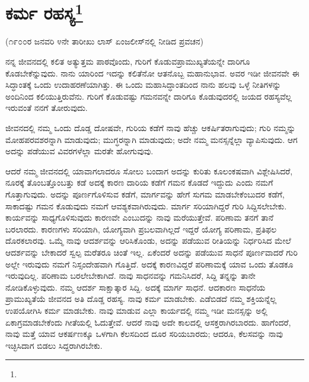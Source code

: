 
\chapter[ಕರ್ಮ ರಹಸ್ಯ]{ಕರ್ಮ ರಹಸ್ಯ\protect\footnote{}}

\begin{center}
(೧೯೦೦ರ ಜನವರಿ ೪ನೇ ತಾರೀಖು ಲಾಸ್ ಏಂಜಲೀಸ್‌ನಲ್ಲಿ ನೀಡಿದ ಪ್ರವಚನ)
\end{center}

ನನ್ನ ಜೀವನದಲ್ಲಿ ಕಲಿತ ಅತ್ಯುತ್ತಮ ಪಾಠವೊಂದು, ಗುರಿಗೆ ಕೊಡುವ\break ಪ್ರಾಮುಖ್ಯತೆಯನ್ನೇ ದಾರಿಗೂ ಕೊಡಬೇಕೆನ್ನುವುದು. ನಾನು ಯಾರಿಂದ ಇದನ್ನು ಕಲಿತೆನೋ ಆತನೊಬ್ಬ ಮಹಾನುಭಾವ. ಅವರ ಇಡೀ ಜೀವನವೇ ಈ ಸಿದ್ಧಾಂತಕ್ಕೆ ಒಂದು ಉದಾಹರಣೆಯಾಗಿತ್ತು. ಈ ಒಂದು ಮಹಾಸಿದ್ಧಾಂತದಿಂದ ನಾನು ಹಲವು ಒಳ್ಳೆ ನೀತಿಗಳನ್ನು ಅಂದಿನಿಂದ ಕಲಿಯುತ್ತಿರುವೆನು. ಗುರಿಗೆ ಕೊಡುವಷ್ಟು ಗಮನವನ್ನೇ ದಾರಿಗೂ ಕೊಡುವುದರಲ್ಲಿ ಜಯದ ರಹಸ್ಯವೆಲ್ಲ ಇರುವಂತೆ ನನಗೆ ತೋರುವುದು.

ಜೀವನದಲ್ಲಿ ನಮ್ಮ ಒಂದು ದೊಡ್ಡ ದೋಷವೇ, ಗುರಿಯ ಕಡೆಗೆ ನಾವು ಹೆಚ್ಚು ಆಕರ್ಷಿತರಾಗುವುದು; ಗುರಿ ನಮ್ಮನ್ನು ಮೋಹಪರವಶರನ್ನಾಗಿ ಮಾಡುವುದು; ಮುಗ್ಧರನ್ನಾಗಿ ಮಾಡುವುದು; ಅದೇ ನಮ್ಮ ಮನಸ್ಸನ್ನೆಲ್ಲಾ ವ್ಯಾಪಿಸುವುದು. ಆಗ ಅದನ್ನು ಪಡೆಯುವ ವಿವರಗಳೆಲ್ಲಾ ಮರತೇ ಹೋಗುವುವು.

ಆದರೆ ನಮ್ಮ ಜೀವನದಲ್ಲಿ ಯಾವಾಗಲಾದರೂ ಸೋಲು ಬಂದಾಗ ಅದನ್ನು ಕುರಿತು ಕೂಲಂಕಷವಾಗಿ ವಿಶ್ಲೇಷಿಸಿದರೆ, ನೂರಕ್ಕೆ ತೊಂಬತ್ತೊಂಬತ್ತು ಕಡೆ ಅದಕ್ಕೆ ಕಾರಣ ದಾರಿಯ ಕಡೆಗೆ ಗಮನ ಕೊಡದೆ ಇದ್ದುದು ಎಂದು ನಮಗೆ ಗೊತ್ತಾಗುವುದು. ಅದನ್ನು ಪೂರ್ಣಗೊಳಿಸುವ ಕಡೆಗೆ, ಮಾರ್ಗವನ್ನು ಹೇಗೆ ಸುಗಮ ಮಾಡಬೇಕೆಂಬುದರ ಕಡೆಗೆ, ಸಾಕಾದಷ್ಟು ಗಮನ ಕೊಡುವುದು ನಮಗೆ ಆವಶ್ಯಕವಾಗಿರುವುದು. ಮಾರ್ಗ ಸರಿಯಾಗಿದ್ದರೆ ಗುರಿ ಸಿದ್ದಿಸಲೇಬೇಕು. ಕಾರ್ಯವನ್ನು ಸಾಧ್ಯಗೊಳಿಸುವುದು ಕಾರಣವೇ ಎಂಬುದನ್ನು ನಾವು ಮರೆಯುತ್ತೇವೆ. ಪರಿಣಾಮ ತನಗೆ ತಾನೆ ಬರಲಾರದು. ಕಾರಣಗಳು ಸರಿಯಾಗಿ, ಯೋಗ್ಯವಾಗಿ ಪ್ರಬಲವಾಗಿಲ್ಲದೆ ಇದ್ದರೆ ಯೋಗ್ಯ ಪರಿಣಾಮ, ಪ್ರತಿಫಲ ದೊರಕಲಾರವು. ಒಮ್ಮೆ ನಾವು ಆದರ್ಶವನ್ನು ಆರಿಸಿಕೊಂಡು, ಅದನ್ನು ಪಡೆಯುವ ರೀತಿಯನ್ನು ನಿರ್ಧರಿಸಿದ ಮೇಲೆ ಆದರ್ಶವನ್ನು ಬೇಕಾದರೆ ಸ್ವಲ್ಪ ಮರೆತರೂ ಚಿಂತೆ ಇಲ್ಲ. ಏಕೆಂದರೆ ಅದನ್ನು ಪಡೆಯುವ ಸಾಧನೆ ಪೂರ್ಣವಾದರೆ ಗುರಿ ಅಲ್ಲೇ ಇರುವುದು ನಮಗೆ ನಿಸ್ಸಂದೇಹವಾಗಿ ಗೊತ್ತಿದೆ. ಅದಕ್ಕೆ ಕಾರಣವಿದ್ದರೆ ಪರಿಣಾಮಕ್ಕೆ ಯಾವ ಒಂದು ತೊಡಕೂ ಇರುವುದಿಲ್ಲ. ಪರಿಣಾಮ ಬರಲೇಬೇಕಾಗಿದೆ. ನಾವು ಸಾಧನವನ್ನು ಗಮನಿಸಿದರೆ, ಸಿದ್ದಿ ತನ್ನನ್ನು ತಾನೇ ನೋಡಿಕೊಳ್ಳುವುದು. ನಮ್ಮ ಆದರ್ಶ ಸಾಕ್ಷಾತ್ಕಾರ ಸಿದ್ದಿ. ಅದಕ್ಕೆ ಮಾರ್ಗ ಸಾಧನೆ. ಆದಕಾರಣ ಸಾಧನೆಯ ಪ್ರಾಮುಖ್ಯತೆಯೆ ಜೀವನದ ಅತಿ ದೊಡ್ಡ ರಹಸ್ಯ. ನಾವು ಕರ್ಮ ಮಾಡಬೇಕು. ಎಡೆಬಿಡದೆ ನಮ್ಮ ಶಕ್ತಿಯನ್ನೆಲ್ಲ ಉಪಯೋಗಿಸಿ ಕರ್ಮ ಮಾಡಬೇಕು. ನಾವು ಮಾಡುವ ಎಲ್ಲಾ ಕಾರ್ಯದಲ್ಲಿ ನಮ್ಮ ಇಡೀ ಮನಸ್ಸನ್ನು ಅಲ್ಲಿ ಏಕಾಗ್ರಮಾಡಬೇಕೆಂದು ಗೀತೆಯಲ್ಲಿ ಓದುತ್ತೇವೆ. ಆದರೆ ನಾವು ಅದೇ ಕಾಲದಲ್ಲಿ ಆಸಕ್ತರಾಗಿರಬಾರದು. ಹಾಗೆಂದರೆ, ನಾವು ಮತ್ತೆ ಯಾವ ಆಕರ್ಷಣಕ್ಕೂ ಒಳಗಾಗಿ ಕೆಲಸದಿಂದ ದೂರ ಸರಿಯಬಾರದು; ಆದರೂ, ಕೆಲಸವನ್ನು ನಾವು ಇಚ್ಛಿಸಿದಾಗ ಬಿಡಲು ಸಿದ್ದರಾಗಿರಬೇಕು.

